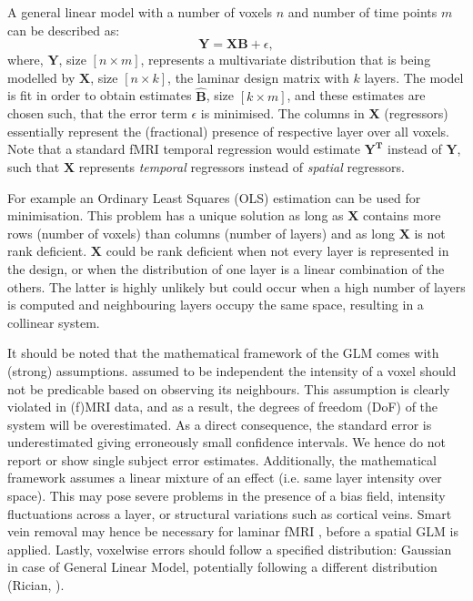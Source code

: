 A general linear model with a number of voxels $n$ and number of time points $m$ can be described as:
\begin{equation}
\mathbf{Y=X B} +\epsilon,
\label{eq:glm}
\end{equation}
where, $\mathbf{Y}$, size $[n\times m]$, represents a multivariate distribution that is being modelled by $\mathbf{X}$, size $[n\times k]$, the laminar design matrix with $k$ layers. The model is fit in order to obtain estimates $\hat{\mathbf{B}}$, size $[k\times m]$, and these estimates are chosen such, that the error term $\epsilon$ is minimised.
The columns in $\mathbf{X}$ (regressors) essentially represent the (fractional) presence of respective layer over all voxels. Note that a standard fMRI temporal regression would estimate $\mathbf{Y^T}$ instead of $\mathbf{Y}$, such that $\mathbf{X}$ represents \emph{temporal} regressors instead of \emph{spatial} regressors.

For example an Ordinary Least Squares (OLS) estimation can be used for minimisation. This problem has a unique solution as long as $\mathbf{X}$ contains more rows (number of voxels) than columns (number of layers) and as long $\mathbf{X}$ is not rank deficient. $\mathbf{X}$ could be rank deficient when not every layer is represented in the design, or when the distribution of one layer is a linear combination of the others. The latter is highly unlikely but could occur when a high number of layers is computed and neighbouring layers occupy the same space, resulting in a collinear system. 

It should be noted that the mathematical framework of the GLM comes with (strong) assumptions.  assumed to be independent  the intensity of a voxel should not be predicable based on observing its neighbours. This assumption is clearly violated in (f)MRI data, and as a result, the degrees of freedom (DoF) of the system will be overestimated. As a direct consequence, the standard error is underestimated giving erroneously small confidence intervals. We hence do not report or show single subject error estimates. Additionally, the mathematical framework assumes a linear mixture of an  effect (i.e. same layer intensity over space). This may pose severe problems in the presence of a bias field, intensity fluctuations across a layer, or structural variations such as cortical veins. Smart vein removal may hence be necessary for laminar fMRI \cite{Koopmans2010,Fracasso2017}, before a spatial GLM is applied. Lastly, voxelwise errors should follow a specified distribution: Gaussian in case of General Linear Model, potentially following a different distribution (Rician, \cite{Gudbjartsson1995}).

